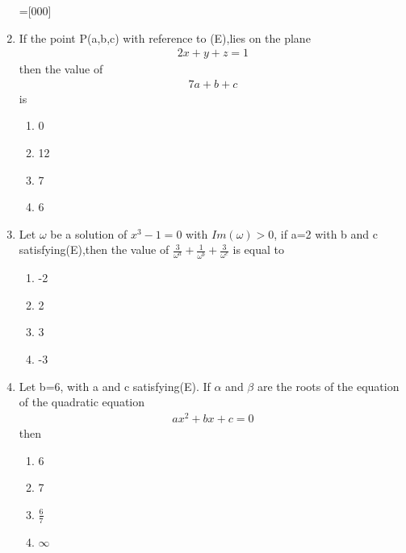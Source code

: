 \begin{enumerate}
=[000]
\item If the point P(a,b,c) with reference to (E),lies on the plane \begin{align} 2x+y+z=1\end{align} then the value of \begin{align} 7a+b+c\end{align} is
\begin{enumerate}
 \item 0
 \item 12
 \item 7
 \item 6
\end{enumerate}
\item Let $\omega$ be a solution of $x^3-1=0$ with $Im(\omega)>0$, if a=2 with b and c satisfying(E),then the value of $\frac{3}{\omega^a}+\frac{1}{\omega^b}+\frac{3}{\omega^c}$ is equal to 
\begin{enumerate}
 \item -2
 \item  2
 \item 3
 \item -3
\end{enumerate}
\item Let b=6, with a and c satisfying(E). If $\alpha$ and $\beta$ are the roots of the equation of the quadratic equation \begin{align}ax^2+bx+c=0\end{align} then 
\begin{enumerate}
 \item 6
 \item 7
 \item $\frac{6}{7}$
 \item $\infty$
\end{enumerate}
\end{enumerate}
